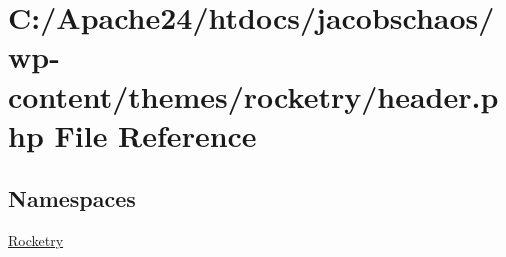 \hypertarget{header_8php}{}\section{C\+:/\+Apache24/htdocs/jacobschaos/wp-\/content/themes/rocketry/header.php File Reference}
\label{header_8php}
\subsection*{Namespaces}
\begin{DoxyCompactItemize}
\item 
 \hyperlink{namespace_rocketry}{Rocketry}
\end{DoxyCompactItemize}
